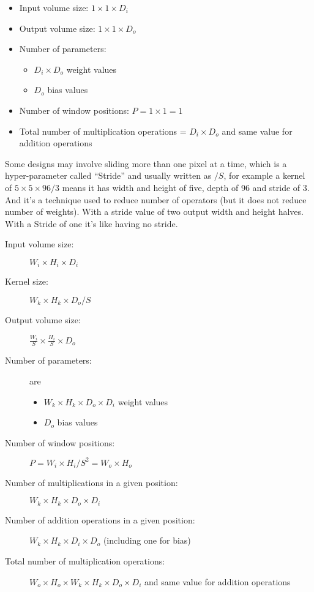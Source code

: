 \begin{itemize}
\item Input volume size: \(1 \times 1 \times D_i \)
\item Output volume size: \( 1 \times 1 \times D_o \)
\item Number of parameters:
    \begin{itemize}
    \item \( D_i \times D_o \) weight values
    \item \( D_o \) bias values
    \end{itemize}
\item Number of window positions: \( P = 1 \times 1 = 1 \)
\item Total number of multiplication operations = \( D_i\times D_o \) and same value for addition operations
\end{itemize}

Some designs may involve sliding more than one pixel at a time, which is a hyper-parameter called ``Stride''
and usually written as \(/S\), for example a kernel of \(5×5×96/3\) means it has width and height of five,
depth of 96 and stride of 3.
And it's a technique used to reduce number of operators (but it does not reduce number of weights).
With a stride value of two output width and height halves. With a Stride of one it's like having no stride.

\begin{description}
\item [Input volume size:] \( W_i\times H_i\times D_i \)
\item [Kernel size:] \( W_k\times H_k\times D_o / S \)
\item [Output volume size:] \( \frac{W_i}{S} \times \frac{H_i}{S} \times D_o \)
\item [Number of parameters:] are
\begin{itemize}
\item \(W_k\times H_k\times D_o\times D_i \) weight values
\item \(D_o\) bias values
\end{itemize}
\item [Number of window positions:] \( P = W_i\times H_i / S^2 = W_o\times H_o \)
\item [Number of multiplications in a given position:] \( W_k\times H_k\times D_o \times D_i \)
\item [Number of addition operations in a given position:] \( W_k\times H_k\times D_i\times D_o\) (including one for bias)
\item [Total number of multiplication operations:] \(W_o\times H_o\times W_k\times H_k\times D_o\times D_i \) and same value for addition operations
\end{description}

